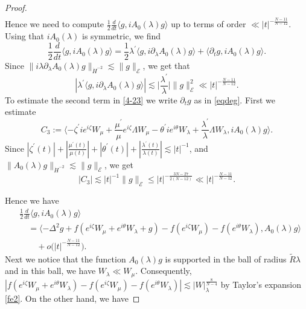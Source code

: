 \documentclass[a4paper,two-side,10pt]{amsart}
\numberwithin{equation}{section}
\begin{document}
\begin{proof}
\begin{align}
\end{align}
Hence we need to compute $ \frac{1}{2} \frac{d}{dt} \langle g, iA_0 (\lambda ) g \rangle$ up to terms of order $\ll |t|^{-\frac{N-11}{N-12}}$.
Using that $iA_0 (\lambda)$ is symmetric, we find
\begin{equation}\label{4-23}
\frac{1}{2} \frac{d}{dt} \langle g, iA_0 (\lambda ) g \rangle  = \frac{1}{2}\lambda^\prime \langle g, i\partial_\lambda A_0 (\lambda) g \rangle + \langle \partial_t g , iA_0 (\lambda) g\rangle.
\end{equation}
Since $\|i\lambda \partial_\lambda A_0 (\lambda) g \|_{\dot{H}^{-2}} \lesssim \|g\|_{\mathcal{E}}$, we get that
$$|\lambda^\prime \langle g, i\partial_\lambda A_0 (\lambda) g \rangle| \lesssim \big|\frac{\lambda^\prime}{\lambda}\big| \|g\|_{\mathcal{E}}^2
\ll |t|^{-\frac{N-11}{N-12}} .$$
To estimate the second term in \eqref{4-23} we write
 $\partial_t g$ as in \eqref{eqdeg}. First we estimate 
 $$C_3:=\langle -  \zeta^\prime i e^{i\zeta} W_\mu + \frac{\mu^\prime}{\mu} e^{i\zeta}\Lambda W_\mu -\theta^\prime i e^{i\theta} W_\lambda + \frac{\lambda^\prime}{\lambda} \Lambda W_\lambda , iA_0(\lambda) g \rangle . $$
Since $|\zeta^\prime (t)| +|\frac{\mu^\prime (t)}{\mu (t)}| + |\theta^\prime (t)|+ |\frac{\lambda^\prime (t)}{\lambda (t)}|\lesssim |t|^{-1} $, and $\|A_0 (\lambda) g\|_{\dot{H}^{-2}}\lesssim \|g\|_{\mathcal{E}}$, we get
$$|C_3|\lesssim |t|^{-1}\|g\|_{\mathcal{E}}
\le |t|^{-\frac{3N-27}{2(N-12)}}\ll |t|^{-\frac{N-11}{N-12}}. $$

Hence we have
\begin{align*}
&
\frac{1}{2} \frac{d}{dt} \langle g, iA_0 (\lambda ) g \rangle \\
&\quad= \langle -\Delta^2 g + f(e^{i\zeta} W_\mu +e^{i\theta}W_\lambda +g)- f(e^{i\zeta} W_\mu) - f(e^{i\theta} W_\lambda)  , A_0 (\lambda )g\rangle\\
&\qquad
+o\big(|t|^{-\frac{N-11}{N-12}}\big) .
\end{align*}
Next we notice that the function $A_0 (\lambda ) g$ is supported in the ball of radius $\tilde{R}\lambda$ and in this ball, we have $W_\lambda \ll W_\mu$. Consequently,  
$|f(e^{i\zeta} W_\mu +e^{i\theta}W_\lambda) - f(e^{i\zeta}W_\mu)- f (e^{i\theta}W_\lambda)|\lesssim |W|_\lambda^{\frac{8}{N-4}}$ by Taylor's expansion \eqref{fe2}. On the other hand, we have

\end{proof}
\end{document}
